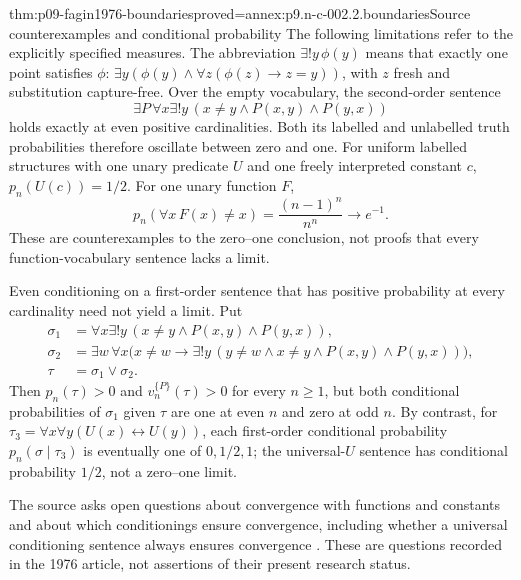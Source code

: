 \begin{hbtheorem}{thm:p09-fagin1976-boundaries}{proved=annex:p9.n-c-002.2.boundaries}{Source counterexamples and conditional probability}
The following limitations refer to the explicitly specified measures.
The abbreviation \(\exists!y\,\phi(y)\) means that exactly one
point satisfies \(\phi\):
\(\exists y(\phi(y)\land\forall z(\phi(z)\to z=y))\), with
\(z\) fresh and substitution capture-free.
Over the empty vocabulary, the second-order sentence
\[
 \exists P\,\forall x\exists!y\,
        (x\ne y\land P(x,y)\land P(y,x))
\]
holds exactly at even positive cardinalities.  Both its labelled and
unlabelled truth probabilities therefore oscillate between zero and one.
For uniform labelled structures with one unary predicate \(U\) and
one freely interpreted constant \(c\), \(p_n(U(c))=1/2\).
For one unary function \(F\),
\[
 p_n(\forall x\,F(x)\ne x)=\frac{(n-1)^n}{n^n}
                         \longrightarrow e^{-1}.
\]
These are counterexamples to the zero--one conclusion, not proofs that
every function-vocabulary sentence lacks a limit.

Even conditioning on a first-order sentence that has positive probability
at every cardinality need not yield a limit.  Put
\[
\begin{split}
 \sigma_1&=\forall x\exists!y\,(x\ne y\land P(x,y)\land P(y,x)),\\
 \sigma_2&=\exists w\,\forall x\bigl(x\ne w\to
    \exists!y\,(y\ne w\land x\ne y\land P(x,y)\land P(y,x))\bigr),\\
 \tau&=\sigma_1\lor\sigma_2.
\end{split}
\]
Then \(p_n(\tau)>0\) and \(v_n^{\{P\}}(\tau)>0\) for every
\(n\geq1\), but both conditional probabilities of \(\sigma_1\)
given \(\tau\) are one at even \(n\) and zero at odd \(n\).
By contrast, for \(\tau_3=\forall x\forall y(U(x)\leftrightarrow U(y))\),
each first-order conditional probability \(p_n(\sigma\mid\tau_3)\)
is eventually one of \(0,1/2,1\); the universal-\(U\) sentence has
conditional probability \(1/2\), not a zero--one limit.
\end{hbtheorem}

The source asks open questions about convergence with functions and
constants and about which conditionings ensure convergence,
including whether a universal conditioning sentence always ensures
convergence \cite[pp.~56--58]{Fagin1976}.  These are questions recorded in the
1976 article, not assertions of their present research status.

